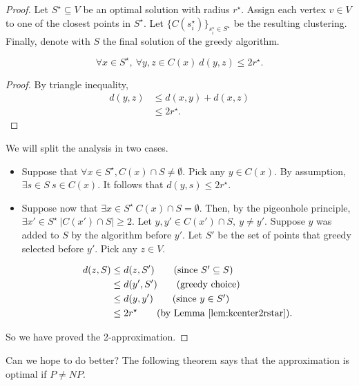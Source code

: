 \begin{proof}
Let $S^\star \subseteq V$ be an optimal solution with radius $r^\star$. Assign each vertex $v \in V$ to one of the closest points in $S^\star$. Let $\{C(s_i^\star)\}_{s_i^\star \in S^\star}$ be the resulting clustering. Finally, denote with $S$ the final solution of the greedy algorithm.

\begin{lem}\label{lem:kcenter2rstar}
	\begin{equation}
	\forall x \in S^\star,\ \forall y, z \in C(x)\ d(y, z) \leq 2r^\star.
	\end{equation}
\end{lem}

\begin{proof}
	By triangle inequality,
	\begin{align}
		d(y, z) &\leq d(x, y) + d(x, z)\\
		&\leq 2r^\star.
	\end{align}
\end{proof}

We will split the analysis in two cases.

\begin{itemize}
	\item Suppose that $\forall x \in S^\star, C(x) \cap S \neq \emptyset$. Pick any $y \in C(x)$. By assumption, $\exists s \in S\  s \in C(x)$. It follows that  $d(y, s) \leq 2r^\star$.
	\item Suppose now that $\exists x \in S^\star\ C(x) \cap S = \emptyset$. Then, by the pigeonhole principle, $\exists x' \in S^\star\ |C(x') \cap S| \geq 2$. Let $y, y' \in C(x') \cap S,\ y \neq y'$. Suppose $y$ was added to $S$ by the algorithm before $y'$. Let $S'$ be the set of points that greedy selected before $y'$. Pick  any $z \in V$.
	
	\begin{align}
		d(z, S) &\leq d(z, S') \tag{since $S' \subseteq S$}\\
		&\leq d(y', S') \tag{greedy choice}\\
		&\leq d(y, y') \tag{since $y \in S'$}\\
		&\leq 2r^\star \tag{by Lemma \ref{lem:kcenter2rstar}}.
	\end{align}
\end{itemize}

So we have proved the 2-approximation.
\end{proof}
 Can we hope to do better? The following theorem says that the approximation is optimal if $P\neq NP$.
